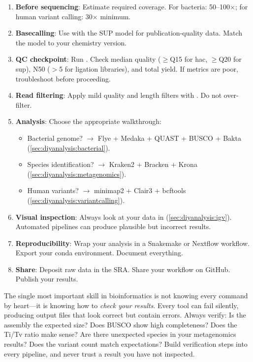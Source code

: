\begin{protocolbox}[title={Complete Analysis Checklist}]
\begin{enumerate}[nosep]
  \item \textbf{Before sequencing}: Estimate required coverage. For bacteria: 50--100$\times$; for human variant calling: 30$\times$ minimum.
  \item \textbf{Basecalling}: Use  with the SUP model for publication-quality data. Match the model to your chemistry version.
  \item \textbf{QC checkpoint}: Run . Check median quality ($\geq$Q15 for hac, $\geq$Q20 for sup), N50 ($>$5\kilobase{} for ligation libraries), and total yield. If metrics are poor, troubleshoot before proceeding.
  \item \textbf{Read filtering}: Apply mild quality and length filters with . Do not over-filter.
  \item \textbf{Analysis}: Choose the appropriate walkthrough:
    \begin{itemize}[nosep]
      \item Bacterial genome? $\rightarrow$ Flye + Medaka + QUAST + BUSCO + Bakta (\cref{sec:diyanalysis:bacterial}).
      \item Species identification? $\rightarrow$ Kraken2 + Bracken + Krona (\cref{sec:diyanalysis:metagenomics}).
      \item Human variants? $\rightarrow$ minimap2 + Clair3 + bcftools (\cref{sec:diyanalysis:variantcalling}).
    \end{itemize}
  \item \textbf{Visual inspection}: Always look at your data in  (\cref{sec:diyanalysis:igv}). Automated pipelines can produce plausible but incorrect results.
  \item \textbf{Reproducibility}: Wrap your analysis in a Snakemake or Nextflow workflow. Export your conda environment. Document everything.
  \item \textbf{Share}: Deposit raw data in the \acrshort{SRA}. Share your workflow on GitHub. Publish your results.
\end{enumerate}
\end{protocolbox}

\begin{keyconcept}[title={The Most Important Skill}]
The single most important skill in bioinformatics is not knowing every command by heart---it is knowing how to \emph{check your results}. Every tool can fail silently, producing output files that look correct but contain errors. Always verify: Is the assembly the expected size? Does BUSCO show high completeness? Does the Ti/Tv ratio make sense? Are there unexpected species in your metagenomics results? Does the variant count match expectations? Build verification steps into every pipeline, and never trust a result you have not inspected.
\end{keyconcept}
